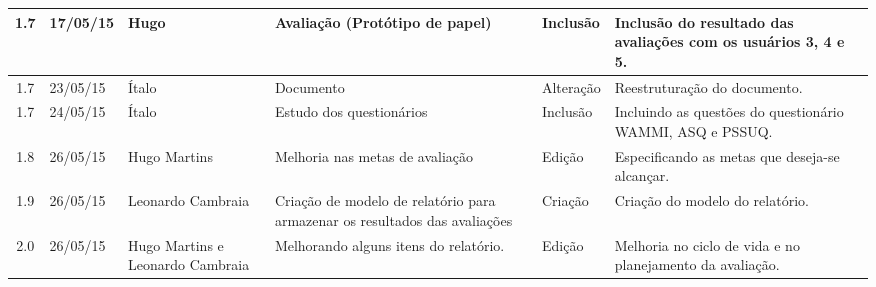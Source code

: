 \begin{table}[h]
\begin{tabular}{|c|m{2cm}|m{2.8cm}|m{2.3cm}|m{2.44cm}|m{4.2cm}|}
  \hline                               
  1.7 & 17/05/15 & Hugo & Avaliação (Protótipo de papel) & Inclusão & Inclusão do resultado das avaliações com os usuários 3, 4 e 5.\\
  
  \hline                               
  1.7 & 23/05/15 & Ítalo & Documento & Alteração & Reestruturação do documento.\\
  
  \hline                               
  1.7 & 24/05/15 & Ítalo & Estudo dos questionários & Inclusão & Incluindo as questões do questionário WAMMI, ASQ e PSSUQ.\\
  
  \hline                               
  1.8 & 26/05/15 & Hugo Martins & Melhoria nas metas de avaliação & Edição & Especificando as metas que deseja-se alcançar.\\
  
  \hline                               
  1.9 & 26/05/15 & Leonardo Cambraia & Criação de modelo de relatório para armazenar os resultados das avaliações & Criação & Criação do modelo do relatório.\\
  
  \hline                               
  2.0 & 26/05/15 & Hugo Martins e Leonardo Cambraia & Melhorando alguns itens do relatório. & Edição & Melhoria no ciclo de vida e no planejamento da avaliação.\\
  
  
  \hline
  \end{tabular}
\end{table}
